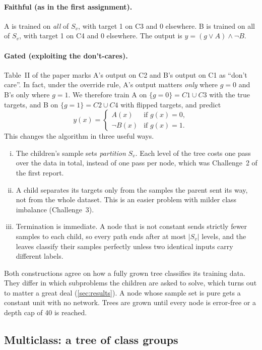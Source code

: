 \paragraph{Faithful (as in the first assignment).} A is trained on \emph{all} of $S_v$, with target 1 on C3 and
0 elsewhere. B is trained on all of $S_v$, with target 1 on C4 and 0 elsewhere. The output is
$y=(g\lor A)\land\lnot B$.

\paragraph{Gated (exploiting the don't-cares).} Table~II of the paper marks A's output on C2 and B's output on
C1 as ``don't care''. In fact, under the override rule, A's output matters \emph{only} where $g=0$ and B's only
where $g=1$. We therefore train A on $\{g=0\}=C1\cup C3$ with the true targets, and B on $\{g=1\}=C2\cup C4$ with
flipped targets, and predict
\[
y(x)=\begin{cases}A(x) & \text{if } g(x)=0,\\ \lnot B(x) & \text{if } g(x)=1.\end{cases}
\]
This changes the algorithm in three useful ways.
\begin{enumerate}[(i)]
\item The children's sample sets \emph{partition} $S_v$. Each level of the tree costs one pass over the data in
total, instead of one pass per node, which was Challenge~2 of the first report.
\item A child separates its targets only from the samples the parent sent its way, not from the whole dataset.
This is an easier problem with milder class imbalance (Challenge~3).
\item Termination is immediate. A node that is not constant sends strictly fewer samples to each child, so
every path ends after at most $|S_v|$ levels, and the leaves classify their samples perfectly unless two
identical inputs carry different labels.
\end{enumerate}
Both constructions agree on how a fully grown tree classifies its training data. They differ in which subproblems
the children are asked to solve, which turns out to matter a great deal (\cref{sec:results}). A node whose sample set is pure gets a constant unit with no network. Trees are grown until every node is
error-free or a depth cap of 40 is reached.

\subsection{Multiclass: a tree of class groups}
\label{sec:hier}

